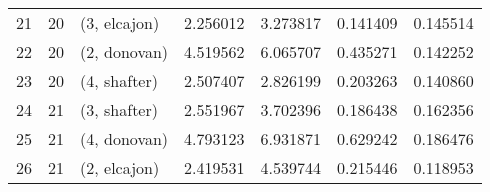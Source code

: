 \begin{tabular}{lllrrrr}
21 &    20 &  (3, elcajon) &  2.256012 &  3.273817 &   0.141409 &  0.145514 \\
22 &    20 &  (2, donovan) &  4.519562 &  6.065707 &   0.435271 &  0.142252 \\
23 &    20 &  (4, shafter) &  2.507407 &  2.826199 &   0.203263 &  0.140860 \\
24 &    21 &  (3, shafter) &  2.551967 &  3.702396 &   0.186438 &  0.162356 \\
25 &    21 &  (4, donovan) &  4.793123 &  6.931871 &   0.629242 &  0.186476 \\
26 &    21 &  (2, elcajon) &  2.419531 &  4.539744 &   0.215446 &  0.118953 \\
\bottomrule
\end{tabular}
